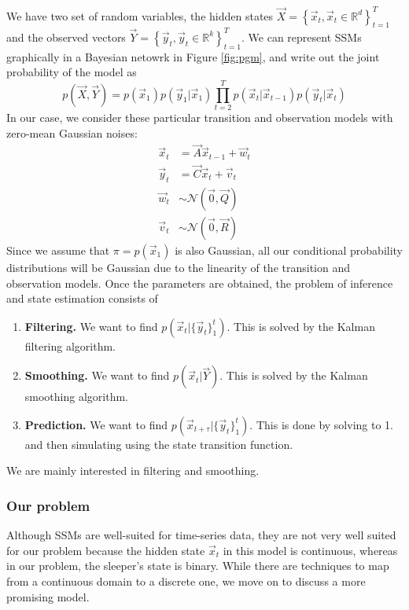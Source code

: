 	We have two set of random variables, the hidden states $\vec X = \left\{ \vec{x}_t,\vec{x}_t \in \mathbb{R}^d \right\}_{t = 1}^{T}$ and the observed vectors $\vec Y = \left\{ \vec{y}_t, \vec{y}_t \in \mathbb{R}^k \right\}_{t = 1}^{T}$. We can represent SSMs graphically in a Bayesian netowrk in Figure \ref{fig:pgm}, and write out the joint probability of the model as
	\begin{equation}
		p\left( \vec X, \vec Y \right) = p(\vec x_1) p(\vec y_1 | \vec x_1) \prod_{t = 2}^{T} {p(\vec x_t | \vec x_{t - 1}) p(\vec y_t | \vec x_t)}
	\end{equation}
In our case, we consider these particular transition and observation models with zero-mean Gaussian noises:
	\begin{align}
		\vec x_t & = \vec A \vec x_{t - 1} + \vec w_t\\
		\vec y_t & = \vec C \vec x_t + \vec v_t \\
		\vec w_t & \sim \mathcal{N} (\vec 0, \vec Q) \\
		\vec v_t & \sim \mathcal{N} (\vec 0, \vec R)
	\end{align}
Since we assume that $\pi = p(\vec x_1)$ is also Gaussian, all our conditional probability distributions will be Gaussian due to the linearity of the transition and observation models. Once the parameters are obtained, the problem of inference and state estimation consists of	
	\begin{enumerate}
		\item \textbf{Filtering.} We want to find $p(\vec x_t | \{\vec y_t\}_1^t)$. This is solved by the Kalman filtering algorithm.
		\item \textbf{Smoothing.} We want to find $p(\vec x_t | \vec Y)$. This is solved by the Kalman smoothing algorithm.
		\item \textbf{Prediction.} We want to find $p(\vec x_{t + \tau} | \{\vec y_t\}_1^t)$. This is done by solving to 1. and then simulating using the state transition function.
	\end{enumerate}
We are mainly interested in filtering and smoothing.

\subsubsection{Our problem}
	Although SSMs are well-suited for time-series data, they are not very well suited for our problem because the hidden state $\vec x_t$ in this model is continuous, whereas in our problem, the sleeper's state is binary. While there are techniques to map from a continuous domain to a discrete one, we move on to discuss a more promising model.